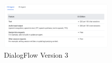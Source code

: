 \documentclass[9pt,software]{livecoms}
\begin{document}
\begin{figure}
  \caption{DialogFlow Version 3}
  \centering
    \includegraphics[width=0.5\textwidth]{CX_Agent.PNG}
\end{figure}








\end{document}
